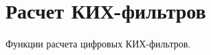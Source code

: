 \hypertarget{group___f_i_r___f_i_l_t_e_r___d_e_s_i_g_n___g_r_o_u_p}{}\section{Расчет КИХ-\/фильтров}
\label{group___f_i_r___f_i_l_t_e_r___d_e_s_i_g_n___g_r_o_u_p}
Функции расчета цифровых КИХ-\/фильтров. 